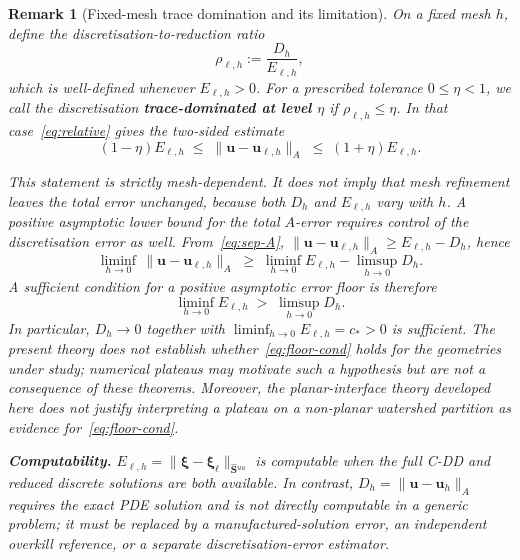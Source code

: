 \documentclass[11pt,a4paper]{article}
\newtheorem{remark}[theorem]{Remark}
\theoremstyle{definition}
\newcommand{\vel}{\bm{u}}
\newcommand{\Schur}{\mathbf{S}}
\newcommand{\Shatuu}{\widehat{\Schur}{}^{uu}}
\begin{document}
\begin{remark}[Fixed-mesh trace domination and its limitation]\label{rem:floor}
  On a fixed mesh $h$, define the discretisation-to-reduction ratio
  \begin{equation}\label{eq:rho}
    \rho_{\ell,h} := \frac{D_h}{E_{\ell,h}},
  \end{equation}
  which is well-defined whenever $E_{\ell,h}>0$.
  For a prescribed tolerance $0\le\eta<1$, we call the discretisation
  \textbf{trace-dominated at level $\eta$} if $\rho_{\ell,h}\le\eta$.
  In that case~\eqref{eq:relative} gives the two-sided estimate
  \begin{equation}\label{eq:trace-dom}
    (1-\eta)E_{\ell,h}
    \;\le\; \|\vel - \vel_{\ell,h}\|_A
    \;\le\; (1+\eta)E_{\ell,h}.
  \end{equation}

  This statement is strictly mesh-dependent.  It does not imply that
  mesh refinement leaves the total error unchanged, because both
  $D_h$ and $E_{\ell,h}$ vary with $h$.  A positive asymptotic lower
  bound for the total $A$-error requires control of the
  discretisation error as well.  From~\eqref{eq:sep-A},
  $\|\vel-\vel_{\ell,h}\|_A \ge E_{\ell,h}-D_h$, hence
  \[
    \liminf_{h\to0}\,\|\vel-\vel_{\ell,h}\|_A
    \;\ge\; \liminf_{h\to0}E_{\ell,h} - \limsup_{h\to0}D_h.
  \]
  A sufficient condition for a positive asymptotic error floor is
  therefore
  \begin{equation}\label{eq:floor-cond}
    \liminf_{h\to0}E_{\ell,h} \;>\; \limsup_{h\to0}D_h.
  \end{equation}
  In particular, $D_h\to0$ together with
  $\liminf_{h\to0}E_{\ell,h}=c_*>0$ is sufficient.
  The present theory does not establish whether~\eqref{eq:floor-cond}
  holds for the geometries under study; numerical plateaus may motivate
  such a hypothesis but are not a consequence of these theorems.
  Moreover, the planar-interface theory developed here does not justify
  interpreting a plateau on a non-planar watershed partition as
  evidence for~\eqref{eq:floor-cond}.

  \textbf{Computability.}  $E_{\ell,h}
  =\|\bm{\xi}-\bm{\xi}_\ell\|_{\Shatuu}$ is computable when the full
  C-DD and reduced discrete solutions are both available.  In contrast,
  $D_h=\|\vel-\vel_h\|_A$ requires the exact PDE solution and is not
  directly computable in a generic problem; it must be replaced by a
  manufactured-solution error, an independent overkill reference, or a
  separate discretisation-error estimator.
\end{remark}
\end{document}
